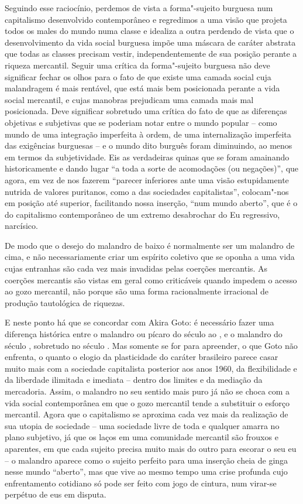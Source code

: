 Seguindo esse raciocínio, perdemos de vista a forma"-sujeito burguesa num
capitalismo desenvolvido contemporâneo e regredimos a uma visão que
projeta todos os males do mundo numa classe e idealiza a outra perdendo
de vista que o desenvolvimento da vida social burguesa impõe uma máscara
de caráter abstrata que todas as classes precisam vestir,
independentemente de sua posição perante a riqueza mercantil. Seguir uma
crítica da forma"-sujeito burguesa não deve significar fechar os olhos
para o fato de que existe uma camada social cuja malandragem é mais
rentável, que está mais bem posicionada perante a vida social mercantil,
e cujas manobras prejudicam uma camada mais mal posicionada. Deve
significar sobretudo uma crítica do fato de que as diferenças objetivas
e subjetivas que se poderiam notar entre o mundo popular -- como mundo
de uma integração imperfeita à ordem, de uma internalização imperfeita
das exigências burguesas -- e o mundo dito burguês foram diminuindo, ao
menos em termos da subjetividade. Eis as verdadeiras quinas que se foram
amainando historicamente e dando lugar ``a toda a sorte de acomodações
(ou negações)'', que agora, em vez de nos fazerem ``parecer inferiores
ante uma visão estupidamente nutrida de valores puritanos, como a das
sociedades capitalistas'', colocam"-nos em posição até superior,
facilitando nossa inserção, ``num mundo aberto'', que é o do capitalismo
contemporâneo de um extremo desabrochar do Eu regressivo, narcísico.

De modo que o desejo do malandro de baixo é normalmente ser um malandro
de cima, e não necessariamente criar um espírito coletivo que se oponha
a uma vida cujas entranhas são cada vez mais invadidas pelas coerções
mercantis. As coerções mercantis são vistas em geral como criticáveis
quando impedem o acesso ao gozo mercantil, não porque são uma forma
racionalmente irracional de produção tautológica de riquezas.

E neste ponto há que se concordar com Akira Goto: é necessário fazer uma
diferença histórica entre o malandro ou pícaro do século  ao , e o
malandro do século , sobretudo no século . Mas somente se for para
apreender, o que Goto não enfrenta, o quanto o elogio da plasticidade do
caráter brasileiro parece casar muito mais com a sociedade capitalista
posterior aos anos 1960, da flexibilidade e da liberdade ilimitada e
imediata -- dentro dos limites e da mediação da mercadoria. Assim, o
malandro no seu sentido mais puro já não se choca com a vida social
contemporânea em que o gozo mercantil tende a substituir o esforço
mercantil. Agora que o capitalismo se aproxima cada vez mais da
realização de sua utopia de sociedade -- uma sociedade livre de toda e
qualquer amarra no plano subjetivo, já que os laços em uma comunidade
mercantil são frouxos e aparentes, em que cada sujeito precisa muito
mais do outro para escorar o seu eu -- o malandro aparece como o sujeito
perfeito para uma inserção cheia de ginga nesse mundo ``aberto'', mas
que vive ao mesmo tempo uma crise profunda cujo enfrentamento cotidiano
só pode ser feito com jogo de cintura, num virar-se perpétuo de eus em
disputa.

